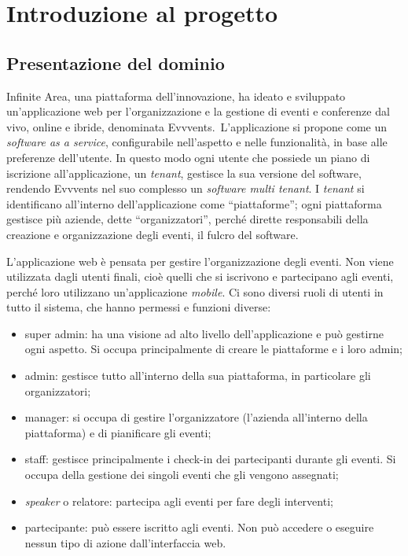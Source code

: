 \section{Introduzione al progetto}
\subsection{Presentazione del dominio}
Infinite Area, una piattaforma dell'innovazione, ha ideato e sviluppato un'applicazione web per l'organizzazione e la gestione di eventi e conferenze dal vivo, online e ibride, denominata Evvvents.\ L'applicazione si propone come un \emph{software as a service}, configurabile nell'aspetto e nelle funzionalità, in base alle preferenze dell'utente. In questo modo ogni utente che possiede un piano di iscrizione all'applicazione, un \emph{tenant}, gestisce la sua versione del software, rendendo Evvvents nel suo complesso un \emph{software multi tenant}. I \emph{tenant} si identificano all'interno dell'applicazione come ``piattaforme''; ogni piattaforma gestisce più aziende, dette ``organizzatori'', perché dirette responsabili della creazione e organizzazione degli eventi, il fulcro del software.

L'applicazione web è pensata per gestire l'organizzazione degli eventi. Non viene utilizzata dagli utenti finali, cioè quelli che si iscrivono e partecipano agli eventi, perché loro utilizzano un'applicazione \emph{mobile}. Ci sono diversi ruoli di utenti in tutto il sistema, che hanno permessi e funzioni diverse:
\begin{itemize}
	\item super admin: ha una visione ad alto livello dell'applicazione e può gestirne ogni aspetto. Si occupa principalmente di creare le piattaforme e i loro admin;
	\item admin: gestisce tutto all'interno della sua piattaforma, in particolare gli organizzatori;
	\item manager: si occupa di gestire l'organizzatore (l'azienda all'interno della piattaforma) e di pianificare gli eventi;
	\item staff: gestisce principalmente i check-in dei partecipanti durante gli eventi. Si occupa della gestione dei singoli eventi che gli vengono assegnati;
	\item \emph{speaker} o relatore: partecipa agli eventi per fare degli interventi;
	\item partecipante: può essere iscritto agli eventi. Non può accedere o eseguire nessun tipo di azione dall'interfaccia web.
\end{itemize}

